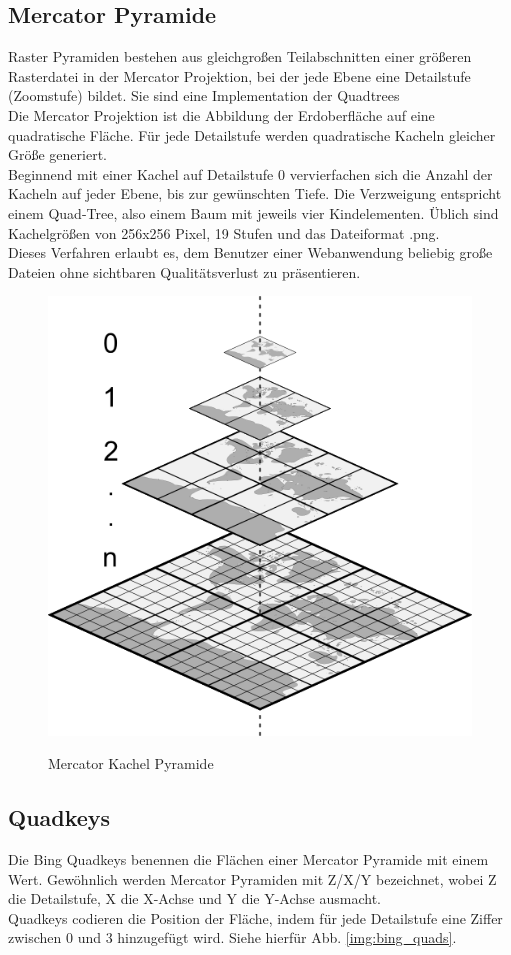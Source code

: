 \documentclass[10pt,conference,compsocconf]{IEEEtran}
\begin{document}
\subsection{Mercator Pyramide}
\label{MercatorPyramide}
Raster Pyramiden bestehen aus gleichgroßen Teilabschnitten einer größeren Rasterdatei in der Mercator Projektion, bei der jede Ebene eine Detailstufe (Zoomstufe) bildet. Sie sind eine Implementation der Quadtrees \\
Die Mercator Projektion ist die Abbildung der Erdoberfläche auf eine quadratische Fläche. Für jede Detailstufe werden quadratische Kacheln gleicher Größe generiert. \\
Beginnend mit einer Kachel auf Detailstufe 0 vervierfachen sich die Anzahl der Kacheln auf jeder Ebene, bis zur gewünschten Tiefe. Die Verzweigung entspricht einem Quad-Tree, also einem Baum mit jeweils vier Kindelementen. Üblich sind Kachelgrößen von 256x256 Pixel, 19 Stufen und das Dateiformat .png. \\
Dieses Verfahren erlaubt es, dem Benutzer einer Webanwendung beliebig große Dateien ohne sichtbaren Qualitätsverlust zu präsentieren.\\
\begin{figure}[H]
	\centering
	\includegraphics[width=0.6\columnwidth]{img/mercator_pyramid.png}\\
	\caption[]{Mercator Kachel Pyramide}
	\label{img:mercator_pyramid}
\end{figure}


\subsection{Quadkeys}
\label{Quadyeys}
Die Bing Quadkeys benennen die Flächen einer Mercator Pyramide mit einem Wert. Gewöhnlich werden Mercator Pyramiden mit Z/X/Y bezeichnet, wobei Z die Detailstufe, X die X-Achse und Y die Y-Achse ausmacht.\\
Quadkeys codieren die Position der Fläche, indem für jede Detailstufe eine Ziffer zwischen 0 und 3 hinzugefügt wird. Siehe hierfür Abb. \ref{img:bing_quads}.
\end{document}
